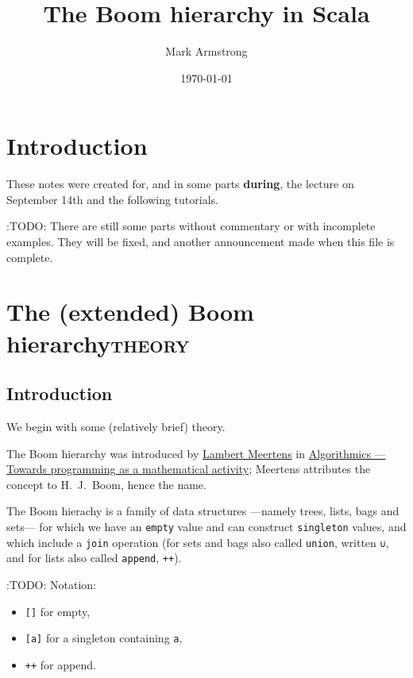 \documentclass[11pt]{article}
\author{Mark Armstrong}
\date{\today}
\title{The Boom hierarchy in Scala}
\begin{document}
\maketitle
\tableofcontents


\section{Introduction}
\label{sec:org40cc4c2}
These notes were created for, and in some parts \textbf{during},
the lecture on September 14th and the following tutorials.

:TODO: There are still some parts without commentary or with incomplete examples.
They will be fixed, and another announcement made when this file is complete.

\section{The (extended) Boom hierarchy\hfill{}\textsc{theory}}
\label{sec:orge831d1d}
\subsection{Introduction}
\label{sec:org61a7a7d}
We begin with some (relatively brief) theory.

The Boom hierarchy was introduced
by \href{https://www.kestrel.edu/people/meertens/publications/}{Lambert Meertens} in
\href{https://www.kestrel.edu/people/meertens/publications/papers/Algorithmics.pdf}{Algorithmics — Towards programming as a mathematical activity};
Meertens attributes the concept to H. J. Boom, hence the name.

The Boom hierachy is a family of data structures
—namely trees, lists, bags and sets—
for which we have an \texttt{empty} value and can construct \texttt{singleton} values,
and which include a \texttt{join} operation
(for sets and bags also called \texttt{union}, written \texttt{∪},
and for lists also called \texttt{append}, \texttt{++}).

:TODO:
Notation:
\begin{itemize}
\item \texttt{[]} for empty,
\item \texttt{[a]} for a singleton containing \texttt{a},
\item \texttt{++} for append.
\end{itemize}
\end{document}
